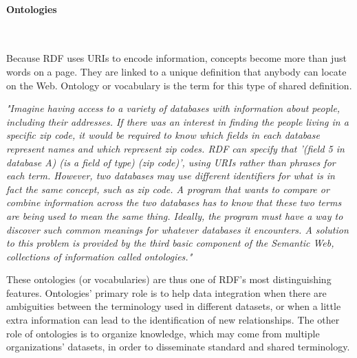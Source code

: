 \paragraph{Ontologies}\label{paragraph:LiteratureReview/ReviewofGraphDatabaseSystems/Graphdatamodels/RDFgraphsOntologiesInferencesSPARQLSemanticWebandLinkedData/Ontologies}\mbox{}\\\indent
\begin{definition}\label{definition:ofontologiesvocabularies}
	Because RDF uses URIs to encode information, concepts become more than just words on a page.
	They are linked to a unique definition that anybody can locate on the Web.
	Ontology or vocabulary is the term for this type of shared definition.
\end{definition}

\begin{quoting}[
	begintext={},
	endtext={ - \citeauthor{BernersLeeHendlerLassila2001} in \citetitle{BernersLeeHendlerLassila2001} (\citeyear{BernersLeeHendlerLassila2001})\sfcite{BernersLeeHendlerLassila2001}}
]
	\textit{
		"Imagine having access to a variety of databases with information about people, including their addresses.
		If there was an interest in finding the people living in a specific zip code, it would be required to know which fields in each database represent names and which represent zip codes.
		RDF can specify that '(field 5 in database A) (is a field of type) (zip code)', using URIs rather than phrases for each term.
		However, two databases may use different identifiers for what is in fact the same concept, such as zip code.
		A program that wants to compare or combine information across the two databases has to know that these two terms are being used to mean the same thing.
		Ideally, the program must have a way to discover such common meanings for whatever databases it encounters.
		A solution to this problem is provided by the third basic component of the Semantic Web, collections of information called ontologies."
	}
\end{quoting}

These ontologies (or vocabularies) are thus one of RDF's most distinguishing features.
Ontologies' primary role is to help data integration when there are ambiguities between the terminology used in different datasets, or when a little extra information can lead to the identification of new relationships.
The other role of ontologies is to organize knowledge, which may come from multiple organizations' datasets, in order to disseminate standard and shared terminology.
\par
